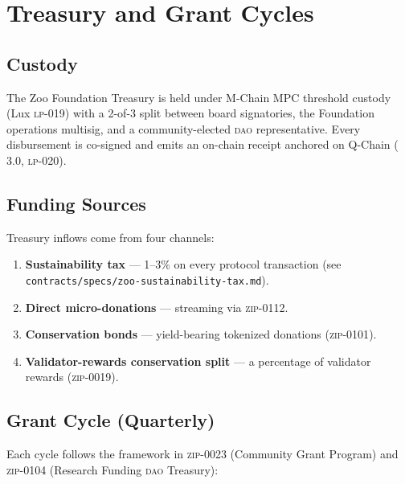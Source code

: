 \section{Treasury and Grant Cycles}
\label{sec:treasury}

\subsection{Custody}

The Zoo Foundation Treasury is held under M-Chain MPC threshold custody
(Lux \textsc{lp-019}) with a 2-of-3 split between board signatories,
the Foundation operations multisig, and a community-elected
\textsc{dao}{} representative. Every disbursement is co-signed and
emits an on-chain receipt anchored on Q-Chain (\Quasar{} 3.0,
\textsc{lp-020}).

\subsection{Funding Sources}

Treasury inflows come from four channels:

\begin{enumerate}[nosep,leftmargin=1.4em]
\item \textbf{Sustainability tax} --- 1--3\% on every protocol
  transaction (see \texttt{contracts/specs/zoo-sustainability-tax.md}).
\item \textbf{Direct micro-donations} --- streaming via
  \textsc{zip-0112}.
\item \textbf{Conservation bonds} --- yield-bearing tokenized donations
  (\textsc{zip-0101}).
\item \textbf{Validator-rewards conservation split} --- a percentage of
  validator rewards (\textsc{zip-0019}).
\end{enumerate}

\subsection{Grant Cycle (Quarterly)}

Each cycle follows the framework in \textsc{zip-0023} (Community Grant
Program) and \textsc{zip-0104} (Research Funding \textsc{dao} Treasury):

